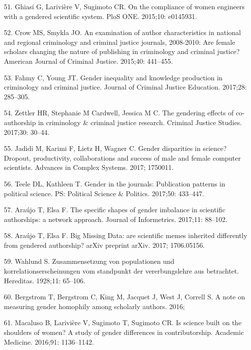 \documentclass[12pt,]{article}
\begin{document}
\leavevmode\hypertarget{ref-Ghiasi_2015}{}%
51. Ghiasi G, Larivière V, Sugimoto CR. On the compliance of women
engineers with a gendered scientific system. PloS ONE. 2015;10:
e0145931.

\leavevmode\hypertarget{ref-Crow_2015}{}%
52. Crow MS, Smykla JO. An examination of author characteristics in
national and regional criminology and criminal justice journals,
2008-2010: Are female scholars changing the nature of publishing in
criminology and criminal justice? American Journal of Criminal Justice.
2015;40: 441--455.

\leavevmode\hypertarget{ref-Fahmy_2017}{}%
53. Fahmy C, Young JT. Gender inequality and knowledge production in
criminology and criminal justice. Journal of Criminal Justice Education.
2017;28: 285--305.

\leavevmode\hypertarget{ref-Zettler_2017}{}%
54. Zettler HR, Stephanie M Cardwell, Jessica M C. The gendering effects
of co-authorship in criminology \& criminal justice research. Criminal
Justice Studies. 2017;30: 30--44.

\leavevmode\hypertarget{ref-Jadidi_2017}{}%
55. Jadidi M, Karimi F, Lietz H, Wagner C. Gender disparities in
science? Dropout, productivity, collaborations and success of male and
female computer scientists. Advances in Complex Systems. 2017; 1750011.

\leavevmode\hypertarget{ref-Teele_2017}{}%
56. Teele DL, Kathleen T. Gender in the journals: Publication patterns
in political science. PS: Political Science \& Politics. 2017;50:
433--447.

\leavevmode\hypertarget{ref-Araujo_2017a}{}%
57. Araújo T, Elsa F. The specific shapes of gender imbalance in
scientific authorships: a network approach. Journal of Informetrics.
2017;11: 88--102.

\leavevmode\hypertarget{ref-Araujo_2017b}{}%
58. Araújo T, Elsa F. Big Missing Data: are scientific memes inherited
differently from gendered authorship? arXiv preprint arXiv. 2017;
1706.05156.

\leavevmode\hypertarget{ref-Wahlund_1928}{}%
59. Wahlund S. Zusammensetzung von populationen und
korrelationserscheinungen vom standpunkt der vererbungslehre aus
betrachtet. Hereditas. 1928;11: 65--106.

\leavevmode\hypertarget{ref-bergstrom_2016}{}%
60. Bergstrom T, Bergstrom C, King M, Jacquet J, West J, Correll S. A
note on measuring gender homophily among scholarly authors. 2016;

\leavevmode\hypertarget{ref-macaluso_2016}{}%
61. Macaluso B, Larivière V, Sugimoto T, Sugimoto CR. Is science built
on the shoulders of women? A study of gender differences in
contributorship. Academic Medicine. 2016;91: 1136--1142.
\end{document}
